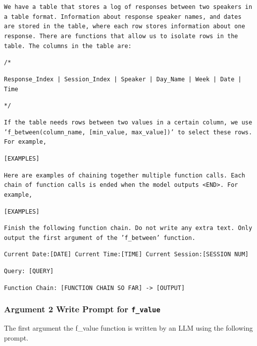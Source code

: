 \documentclass{article}
\begin{document}
\colorbox{prompt_gray}{\begin{minipage}{.98\textwidth}
\texttt{We have a table that stores a log of responses between two speakers in a table format. Information about response speaker names, and dates are stored in the table, where each row stores information about one response. There are functions that allow us to isolate rows in the table. The columns in the table are:}
\newline

\texttt{/*}

\texttt{Response\_Index | Session\_Index | Speaker | Day\_Name | Week | Date | Time}

\texttt{*/}
\newline

\texttt{If the table needs rows between two values in a certain column, we use 'f\_between(column\_name, [min\_value, max\_value])' to select these rows. For example,}
\newline

\texttt{[EXAMPLES]}
\newline


\texttt{Here are examples of chaining together multiple function calls. Each chain of function calls is ended when the model outputs <END>. For example,}
\newline

\texttt{[EXAMPLES]}
\newline

\texttt{Finish the following function chain. Do not write any extra text. Only output the first argument of the 'f\_between' function.}
\newline

\texttt{Current Date:[DATE] Current Time:[TIME] Current Session:[SESSION NUM]}

\texttt{Query: [QUERY]}

\texttt{Function Chain: [FUNCTION CHAIN SO FAR] -> [OUTPUT]}
\end{minipage}}





\newpage
\subsubsection{Argument 2 Write Prompt for \texttt{f\_value}}
The first argument the f\_value function is written by an LLM using the following prompt.
\end{document}
